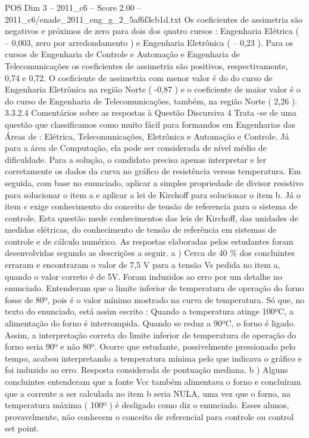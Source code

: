 \begin{textsample}{POS Dim 3 – 2011\_c6 – Score 2.00 – 2011\_c6/enade\_2011\_eng\_g\_2\_5af6f3cb1d.txt}
Os coeficientes de assimetria são negativos e próximos de zero para dois dos quatro cursos : Engenharia Elétrica ( – 0,003, zero por arredondamento ) e Engenharia Eletrônica ( – 0,23 ).
Para os cursos de Engenharia de Controle e Automação e Engenharia de Telecomunicações os coeficientes de assimetria são positivos, respectivamente, 0,74 e 0,72.
O coeficiente de assimetria com menor valor é do do curso de Engenharia Eletrônica na região Norte ( -0,87 ) e o coeficiente de maior valor é o do curso de Engenharia de Telecomunicações, também, na região Norte ( 2,26 ). 3.3.2.4 Comentários sobre as respostas à Questão Discursiva 4 Trata -se de uma questão que classificamos como muito fácil para formandos em Engenharias das Áreas de : Elétrica, Telecomunicações, Eletrônica e Automação e Controle.
Já para a área de Computação, ela pode ser considerada de nível médio de dificuldade.
Para a solução, o candidato precisa apenas interpretar e ler corretamente os dados da curva no gráfico de resistência versus temperatura.
Em seguida, com base no enunciado, aplicar a simples propriedade de divisor resistivo para solucionar o item a e aplicar a lei de Kirchoff para solucionar o item b.
Já o item c exige conhecimento do conceito de tensão de referencia para o sistema de controle.
Esta questão mede conhecimentos das leis de Kirchoff, das unidades de medidas elétricas, do conhecimento de tensão de referência em sistemas de controle e de cálculo numérico.
As respostas elaboradas pelos estudantes foram desenvolvidas segundo as descrições a seguir. a ) Cerca de 40 \% dos concluintes erraram e encontraram o valor de 7,5 V para a tensão Vs pedida no item a, quando o valor correto é de 5V.
Foram induzidos ao erro por um detalhe no enunciado.
Entenderam que o limite inferior de temperatura de operação do forno fosse de 80º, pois é o valor mínimo mostrado na curva de temperatura.
Só que, no texto do enunciado, está assim escrito : Quando a temperatura atinge 100ºC, a alimentação do forno é interrompida.
Quando se reduz a 90ºC, o forno é ligado.
Assim, a interpretação correta do limite inferior de temperatura de operação do forno seria 90º e não 80º.
Ocorre que estudante, possivelmente pressionado pelo tempo, acabou interpretando a temperatura mínima pelo que indicava o gráfico e foi induzido ao erro.
Resposta considerada de pontuação mediana. b ) Alguns concluintes entenderam que a fonte Vcc também alimentava o forno e concluíram que a corrente a ser calculada no item b seria NULA, uma vez que o forno, na temperatura máxima ( 100º ) é desligado como diz o enunciado.
Esses alunos, provavelmente, não conhecem o conceito de referencial para controle ou control set point.

\end{textsample}
